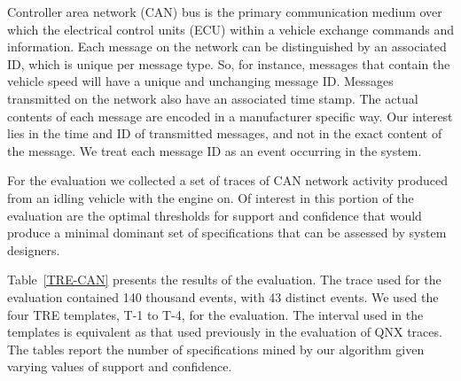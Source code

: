 \documentclass[]{sigplanconf}
\begin{document}
\begin{table}[ht]
  \caption{Mining TREs on CAN Traces} \label{TRE-CAN}
\end{table}

Controller area network (CAN) bus is the primary communication medium over which the electrical control units (ECU) within a vehicle exchange commands and information. Each message on the network can be distinguished by an associated ID, which is unique per message type. So, for instance, messages that contain the vehicle speed will have a unique and unchanging message ID. Messages transmitted on the network also have an associated time stamp. The actual contents of each message are encoded in a manufacturer specific way. Our interest lies in the time and ID of transmitted messages, and not in the exact content of the message. We treat each message ID as an event occurring in the system.

For the evaluation we collected a set of traces of CAN network activity produced from an idling vehicle with the engine on. Of interest in this portion of the evaluation are the optimal thresholds for support and confidence that would produce a minimal dominant set of specifications that can be assessed by system designers.

Table~\ref{TRE-CAN} presents the results of the evaluation. The trace used for the evaluation contained 140 thousand events, with 43 distinct events. We used the four TRE templates, T-1 to T-4, for the evaluation. The interval used in the templates is equivalent as that used previously in the evaluation of QNX traces. The tables report the number of specifications mined by our algorithm given varying values of support and confidence.
\end{document}
